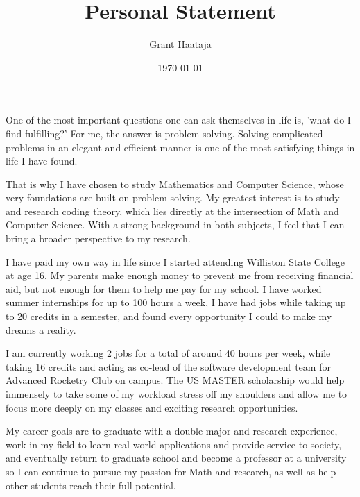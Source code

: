 \documentclass[11pt,final,twoside]{article} %
\title{Personal Statement}
\author{Grant Haataja}
\date{\today}
\begin{document}
	\maketitle

One of the most important questions one can ask themselves in life is, 'what do I find fulfilling?' For me, the answer is problem solving. Solving complicated problems in an elegant and efficient manner is one of the most satisfying things in life I have found. 
 
That is why I have chosen to study Mathematics and Computer Science, whose very foundations are built on problem solving. My greatest interest is to study and research coding theory, which lies directly at the intersection of Math and Computer Science. With a strong background in both subjects, I feel that I can bring a broader perspective to my research.

I have paid my own way in life since I started attending Williston State College at age 16. My parents make enough money to prevent me from receiving financial aid, but not enough for them to help me pay for my school. I have worked summer internships for up to 100 hours a week, I have had jobs while taking up to 20 credits in a semester, and found every opportunity I could to make my dreams a reality. 

I am currently working 2 jobs for a total of around 40 hours per week, while taking 16 credits and acting as co-lead of the software development team for Advanced Rocketry Club on campus. The US MASTER scholarship would help immensely to take some of my workload stress off my shoulders and allow me to focus more deeply on my classes and exciting research opportunities. 

My career goals are to graduate with a double major and research experience, work in my field to learn real-world applications and provide service to society, and eventually return to graduate school and become a professor at a university so I can continue to pursue my passion for Math and research, as well as help other students reach their full potential.
\end{document}
